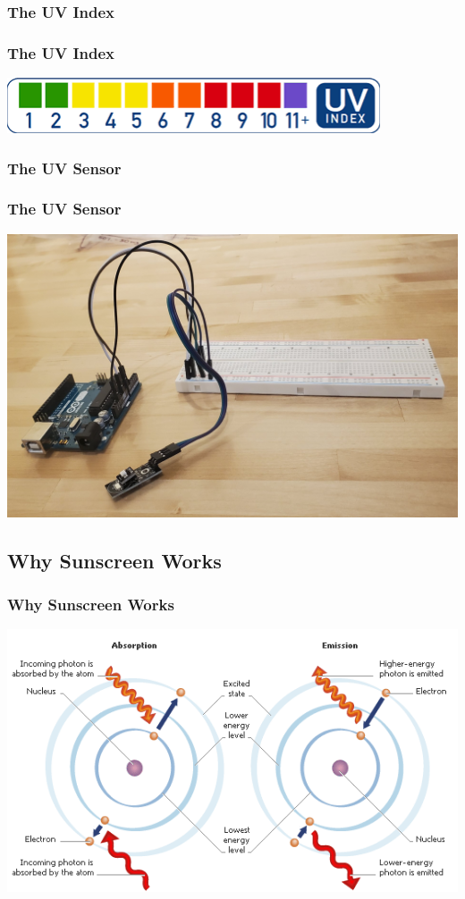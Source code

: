 \documentclass[10pt,aspectratio=169]{beamer} %
\begin{document}
\subsubsection{The UV Index}
\begin{frame}\centering
  \frametitle{The UV Index}
  \includegraphics{UVIndex.png}
\end{frame}
\subsubsection{The UV Sensor}
\begin{frame}\centering
  \frametitle{The UV Sensor}
  \includegraphics[scale = 0.2]{UVSensor.jpg}
\end{frame}

\subsection{Why Sunscreen Works}
\begin{frame}\centering
  \frametitle{Why Sunscreen Works}
  \includegraphics[scale = 0.5]{Absorption.png}
\end{frame}
\end{document}
